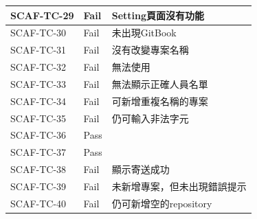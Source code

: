\documentclass{report}
\begin{document}
\begin{tabularx}{\textwidth}{
  |p{}%
  |p{}%
  |p{}|%
}
  \hline
  SCAF-TC-29 & Fail & Setting頁面沒有功能 \\ \hline
  SCAF-TC-30 & Fail & 未出現GitBook \\ \hline
  SCAF-TC-31 & Fail & 沒有改變專案名稱 \\ \hline
  SCAF-TC-32 & Fail & 無法使用 \\ \hline
  SCAF-TC-33 & Fail & 無法顯示正確人員名單 \\ \hline
  SCAF-TC-34 & Fail & 可新增重複名稱的專案 \\ \hline
  SCAF-TC-35 & Fail & 仍可輸入非法字元 \\ \hline
  SCAF-TC-36 & Pass &  \\ \hline
  SCAF-TC-37 & Pass &  \\ \hline
  SCAF-TC-38 & Fail & 顯示寄送成功 \\ \hline
  SCAF-TC-39 & Fail & 未新增專案，但未出現錯誤提示 \\ \hline
  SCAF-TC-40 & Fail & 仍可新增空的repository \\ \hline
\end{tabularx}
\\
\newline
\\
\end{document}
